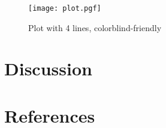 \documentclass{article}
\begin{document}
\newpage



\newpage

\begin{figure}
    \begin{center}
        \texttt{[image: plot.pgf]}
    \end{center}
    \caption{Plot with 4 lines, colorblind-friendly}
\end{figure}

\newpage


\section{Discussion}

\blindtext

\newpage







\section{References}
\begingroup
\renewcommand{\section}[2]{}
\nocite{*}
\printbibliography
\endgroup

\newpage
\end{document}
